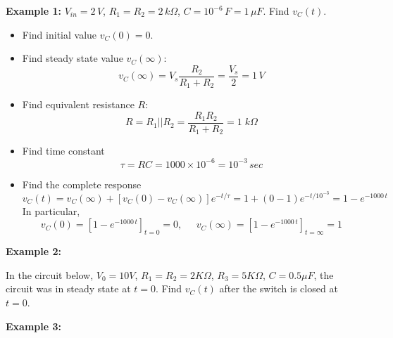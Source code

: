 {\bf Example 1:} $V_{in}=2\,V$, $R_1=R_2=2\,k\Omega$, $C=10^{-6}\,F=1\,\mu F$.
Find $v_C(t)$.



\begin{itemize}
\item Find initial value $v_C(0)=0$. 

\item Find steady state value $v_C(\infty)$:
  \[	
  v_C(\infty)=V_s\frac{R_2}{R_1+R_2}=\frac{V_s}{2} =1\,V
  \]
\item Find equivalent resistance $R$:
  \[
  R=R_1 || R_2=\frac{R_1 R_2}{R_1+R_2}=1\;k\Omega	
  \]
\item Find time constant 
  \[
  \tau=RC=1000\times 10^{-6}= 10^{-3}\,sec     
  \]
\item Find the complete response
  \[
  v_C(t)=v_C(\infty)+[v_C(0)-v_C(\infty)]e^{-t/\tau}
  =1+(0-1)e^{-t/10^{-3}}=1-e^{-1000\,t}
  \]
  In particular,
  \[
  v_C(0)=\left[1-e^{-1000\,t}\right]_{t=0}=0,\;\;\;\;\;
  v_C(\infty)=\left[1-e^{-1000\,t}\right]_{t=\infty}=1
  \]
\end{itemize}

{\bf Example 2:}

In the circuit below, $V_0=10V$, $R_1=R_2=2K\Omega$, $R_3=5K\Omega$, 
$C=0.5\mu F$, the circuit was in steady state at $t=0$. Find $v_C(t)$ 
after the switch is closed at $t=0$.



{\bf Example 3:}

